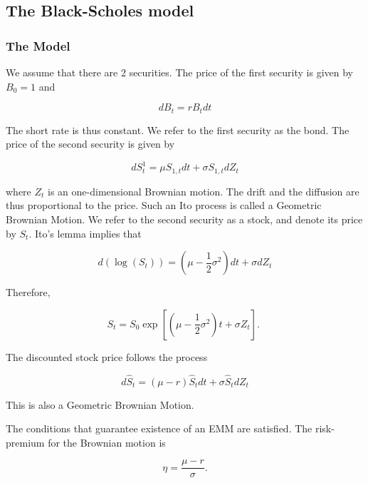 \documentclass[\topdir/lecture\_notes.tex]{subfiles}
\begin{document}
\subsection{The Black-Scholes model}
\subsubsection{The Model}
We assume that there are 2 securities. The price of the first security is given by $B_{0}=1$ and

\begin{equation}
d B_{t}=r B_{t} d t \label{eq:6.3.1}
\end{equation}

The short rate is thus constant. We refer to the first security as the bond. The price of the second security is given by

\begin{equation}
d S_{t}^{1}=\mu S_{1, t} d t+\sigma S_{1, t} d Z_{t} \label{eq:6.3.2}
\end{equation}

where $Z_{t}$ is an one-dimensional Brownian motion. The drift and the diffusion are thus proportional to the price. Such an Ito process is called a Geometric Brownian Motion. We refer to the second security as a stock, and denote its price by $S_{t}$. Ito's lemma implies that

\begin{equation}
d\left(\log \left(S_{t}\right)\right)=\left(\mu-\frac{1}{2} \sigma^{2}\right) d t+\sigma d Z_{t}
\end{equation}

Therefore,

\begin{equation}
S_{t}=S_{0} \exp \left[\left(\mu-\frac{1}{2} \sigma^{2}\right) t+\sigma Z_{t}\right] \text {. }
\end{equation}

The discounted stock price follows the process

\begin{equation}
d \hat{S}_{t}=(\mu-r) \hat{S}_{t} d t+\sigma \hat{S}_{t} d Z_{t}
\end{equation}

This is also a Geometric Brownian Motion.

The conditions that guarantee existence of an EMM are satisfied. The risk-premium for the Brownian motion is

\begin{equation}
\eta=\frac{\mu-r}{\sigma} .
\end{equation}
\end{document}
